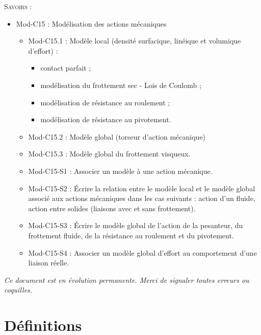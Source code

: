 \documentclass[10pt]{article}
\begin{document}
\begin{savoir}
\textsc{Savoirs :}
\begin{itemize}
\item Mod-C15 : Modélisation des actions mécaniques
\begin{itemize}
\item Mod-C15.1 : Modèle local (densité surfacique, linéique et volumique d’effort) :
\begin{itemize}
\item contact parfait ;
\item modélisation du frottement sec - Lois de Coulomb ;
\item modélisation de résistance au roulement ;
\item modélisation de résistance au pivotement.
\end{itemize}
\item Mod-C15.2 : Modèle global (torseur d’action mécanique)
\item Mod-C15.3 : Modèle global du frottement visqueux.
\end{itemize}
\begin{itemize}
\item Mod-C15-S1 : Associer un modèle à une action mécanique.
\item Mod-C15-S2 : Écrire la relation entre le modèle local et le modèle global associé aux actions mécaniques dans les cas suivants : action d’un fluide, action entre solides (liaisons avec et sans frottement).
\item Mod-C15-S3 : Écrire le modèle global de l’action de la pesanteur, du frottement fluide, de la résistance au roulement et du pivotement.
\item Mod-C15-S4 : Associer un modèle global  d’effort au comportement d’une liaison réelle.
\end{itemize}
\end{itemize}
\end{savoir}

\setlength{\parskip}{0ex plus 0.2ex minus 0ex}
 \renewcommand{\contentsname}{}
 \renewcommand{\baselinestretch}{1}

\tableofcontents

 \renewcommand{\baselinestretch}{1.2}
\setlength{\parskip}{2ex plus 0.5ex minus 0.2ex}

\textit{Ce document est en évolution permanente. Merci de signaler toutes
erreurs ou coquilles.}

\section{Définitions}
\end{document}
